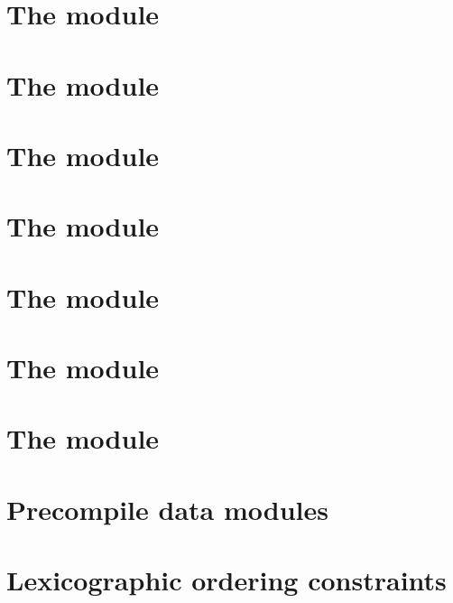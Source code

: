 \documentclass[fleqn]{report}
\begin{document}
\chapter{The \rlpTxnMod{} module}                    \label{chap: txn rlp}         \minitoc    
\chapter{The \userTxnDataMod{} module}               \label{chap: user txn data}   \minitoc    
\chapter{The \systTxnDataMod{} module}               \label{chap: system txn data} \minitoc    
\chapter{The \rlpAddrMod{} module}                   \label{chap: addr rlp}        \minitoc    
\chapter{The \rlpTxnRcptMod{} module}                \label{chap: log rlp}         \minitoc    
\chapter{The \logInfoMod{} module}                   \label{chap: log info}        \minitoc    
\chapter{The \logDataMod{} module}                   \label{chap: log data}        \minitoc    
\chapter{Precompile data modules}                    \label{chap: precompile data} \minitoc    

\appendix
\chapter{Lexicographic ordering constraints}         \label{chap: lex}             \minitoc    
\end{document}
